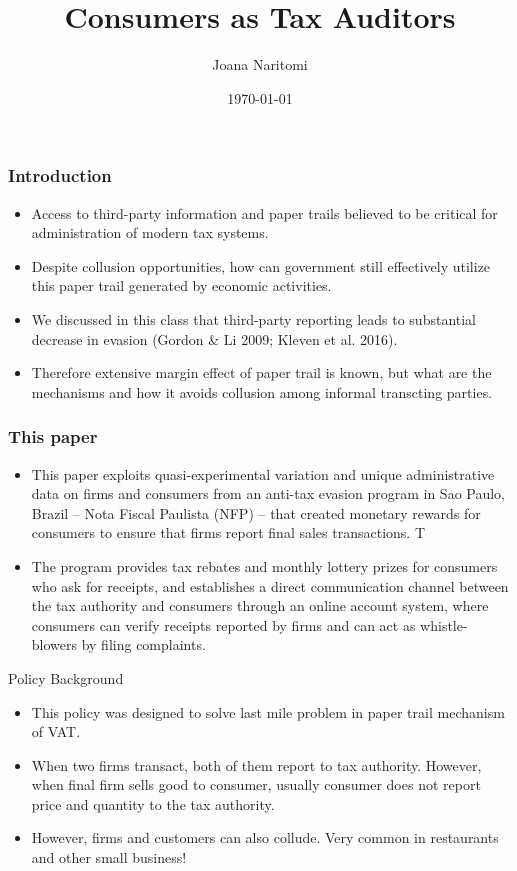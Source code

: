 \documentclass{beamer}
\title{Consumers as Tax Auditors}
\author{Joana Naritomi}
\date{\today}
\begin{document}
\frame{\titlepage}

\begin{frame}
\frametitle{Introduction}
\begin{itemize}
\item Access to third-party information and paper trails believed to be critical for administration of modern tax systems.
\item Despite collusion opportunities, how can government still effectively utilize this paper trail generated by economic activities. 
\item We discussed in this class that third-party reporting leads to substantial decrease in evasion  (Gordon \& Li 2009;
Kleven et al. 2016).
\item Therefore extensive margin effect of paper trail is known, but what are the mechanisms and how it avoids collusion among informal transcting parties.  

\end{itemize}
\end{frame}

\begin{frame}
\frametitle{This paper}
\begin{itemize}
    \item This paper exploits quasi-experimental variation and unique administrative data on firms and consumers from an anti-tax evasion program in Sao Paulo, Brazil – Nota Fiscal Paulista (NFP) – that created monetary rewards for consumers to ensure that firms report final sales transactions. T
    \item The program provides tax rebates and
monthly lottery prizes for consumers who ask for receipts, and establishes a direct communication
channel between the tax authority and consumers through an online account system, where consumers can verify receipts reported by firms and can act as whistle-blowers by filing complaints.
\end{itemize}
\end{frame}

\begin{frame}{Policy Background}
\begin{itemize}
    \item This policy was designed to solve last mile problem in paper trail mechanism of VAT. 
    \item When two firms transact, both of them report to tax authority. However, when final firm sells good to consumer, usually consumer does not report price and quantity to the tax authority. 
    \item However, firms and customers can also collude. Very common in restaurants and other small business! 
\end{itemize}
\end{frame}
\end{document}
